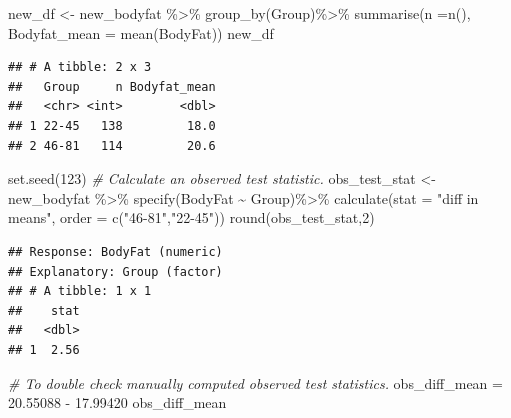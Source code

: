 \documentclass[
]{article}
\newenvironment{Shaded}{\begin{snugshade}}{\end{snugshade}}
\newcommand{\AttributeTok}[1]{\textcolor[rgb]{0.77,0.63,0.00}{#1}}
\newcommand{\CommentTok}[1]{\textcolor[rgb]{0.56,0.35,0.01}{\textit{#1}}}
\newcommand{\DecValTok}[1]{\textcolor[rgb]{0.00,0.00,0.81}{#1}}
\newcommand{\FloatTok}[1]{\textcolor[rgb]{0.00,0.00,0.81}{#1}}
\newcommand{\FunctionTok}[1]{\textcolor[rgb]{0.00,0.00,0.00}{#1}}
\newcommand{\NormalTok}[1]{#1}
\newcommand{\OtherTok}[1]{\textcolor[rgb]{0.56,0.35,0.01}{#1}}
\newcommand{\SpecialCharTok}[1]{\textcolor[rgb]{0.00,0.00,0.00}{#1}}
\newcommand{\StringTok}[1]{\textcolor[rgb]{0.31,0.60,0.02}{#1}}
\begin{document}
\begin{Shaded}
\begin{Highlighting}[]
\NormalTok{new\_df }\OtherTok{\textless{}{-}}\NormalTok{ new\_bodyfat }\SpecialCharTok{\%\textgreater{}\%} \FunctionTok{group\_by}\NormalTok{(Group)}\SpecialCharTok{\%\textgreater{}\%}
  \FunctionTok{summarise}\NormalTok{(}\AttributeTok{n =}\FunctionTok{n}\NormalTok{(),}
            \AttributeTok{Bodyfat\_mean =} \FunctionTok{mean}\NormalTok{(BodyFat))}
\NormalTok{new\_df}
\end{Highlighting}
\end{Shaded}

\begin{verbatim}
## # A tibble: 2 x 3
##   Group     n Bodyfat_mean
##   <chr> <int>        <dbl>
## 1 22-45   138         18.0
## 2 46-81   114         20.6
\end{verbatim}

\begin{Shaded}
\begin{Highlighting}[]
\FunctionTok{set.seed}\NormalTok{(}\DecValTok{123}\NormalTok{)}
\CommentTok{\# Calculate an observed test statistic.}
\NormalTok{obs\_test\_stat }\OtherTok{\textless{}{-}}\NormalTok{ new\_bodyfat }\SpecialCharTok{\%\textgreater{}\%}
  \FunctionTok{specify}\NormalTok{(BodyFat }\SpecialCharTok{\textasciitilde{}}\NormalTok{ Group)}\SpecialCharTok{\%\textgreater{}\%}
  \FunctionTok{calculate}\NormalTok{(}\AttributeTok{stat =} \StringTok{"diff in means"}\NormalTok{, }\AttributeTok{order =} \FunctionTok{c}\NormalTok{(}\StringTok{"46{-}81"}\NormalTok{,}\StringTok{"22{-}45"}\NormalTok{))}
\FunctionTok{round}\NormalTok{(obs\_test\_stat,}\DecValTok{2}\NormalTok{)}
\end{Highlighting}
\end{Shaded}

\begin{verbatim}
## Response: BodyFat (numeric)
## Explanatory: Group (factor)
## # A tibble: 1 x 1
##    stat
##   <dbl>
## 1  2.56
\end{verbatim}

\begin{Shaded}
\begin{Highlighting}[]
\CommentTok{\# To double check manually computed observed test statistics.}
\NormalTok{obs\_diff\_mean }\OtherTok{=} \FloatTok{20.55088} \SpecialCharTok{{-}}  \FloatTok{17.99420}     
\NormalTok{obs\_diff\_mean}
\end{Highlighting}
\end{Shaded}
\end{document}
